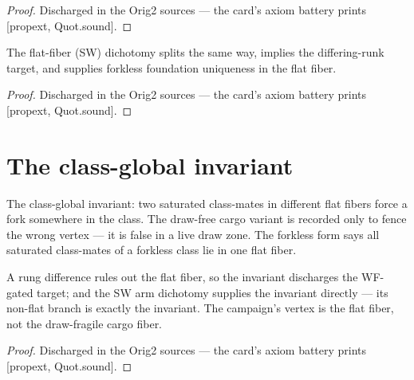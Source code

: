 \begin{proof}
\leanok
Discharged in the Orig2 sources --- the card's axiom battery prints [propext, Quot.sound].
\end{proof}

\begin{theorem}\label{thm:swDichotomy}
\leanok
{}
The flat-fiber (SW) dichotomy splits the same way, implies the
differing-runk target, and supplies forkless foundation
uniqueness in the flat fiber.
\end{theorem}

\begin{proof}
\leanok
Discharged in the Orig2 sources --- the card's axiom battery prints [propext, Quot.sound].
\end{proof}

\section{The class-global invariant}

\begin{definition}\label{def:satFlatFiberFork}
\leanok
{}
The class-global invariant: two saturated class-mates in
different flat fibers force a fork somewhere in the class.  The
draw-free cargo variant is recorded only to fence the wrong
vertex --- it is false in a live draw zone.  The forkless form
says all saturated class-mates of a forkless class lie in one
flat fiber.
\end{definition}

\begin{theorem}\label{thm:flatVertex}
\leanok
{}
A rung difference rules out the flat fiber, so the invariant
discharges the WF-gated target; and the SW arm dichotomy supplies
the invariant directly --- its non-flat branch is exactly the
invariant.  The campaign's vertex is the flat fiber, not the
draw-fragile cargo fiber.
\end{theorem}

\begin{proof}
\leanok
Discharged in the Orig2 sources --- the card's axiom battery prints [propext, Quot.sound].
\end{proof}

